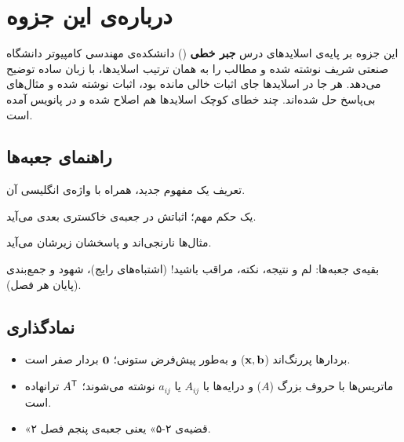 \chapter*{درباره‌ی این جزوه}

این جزوه بر پایه‌ی اسلایدهای درس \textbf{جبر خطی} () دانشکده‌ی مهندسی کامپیوتر دانشگاه صنعتی شریف نوشته شده و مطالب را به همان ترتیب اسلایدها، با زبان ساده توضیح می‌دهد. هر جا در اسلایدها جای اثبات خالی مانده بود، اثبات نوشته شده و مثال‌های بی‌پاسخ حل شده‌اند. چند خطای کوچک اسلایدها هم اصلاح شده و در پانویس آمده است.

\section*{راهنمای جعبه‌ها}
\begingroup
\renewcommand{\theboxnum}{۲-۵}
\begin{definition}
تعریف یک مفهوم جدید، همراه با واژه‌ی انگلیسی آن.
\end{definition}
\begin{theorem}
یک حکم مهم؛ اثباتش در جعبه‌ی خاکستری بعدی می‌آید.
\end{theorem}
\begin{example}
مثال‌ها نارنجی‌اند و پاسخشان زیرشان می‌آید.
\end{example}
\endgroup
بقیه‌ی جعبه‌ها: \textcolor{lemcolor}{\semifont لم و نتیجه}، \textcolor{notecolor}{\semifont نکته}، \textcolor{warncolor}{\semifont مراقب باشید!} (اشتباه‌های رایج)، \textcolor{intuitcolor}{\semifont شهود} و \textcolor{sumcolor}{\semifont جمع‌بندی} (پایان هر فصل).

\section*{نمادگذاری}
\begin{itemize}
  \item بردارها پررنگ‌اند ($\mathbf{x},\mathbf{b}$) و به‌طور پیش‌فرض ستونی؛ $\mathbf{0}$ بردار صفر است.
  \item ماتریس‌ها با حروف بزرگ ($A$) و درایه‌ها با $A_{ij}$ یا $a_{ij}$ نوشته می‌شوند؛ $A^{\mathsf{T}}$ ترانهاده است.
  \item «قضیه‌ی ۲-۵» یعنی جعبه‌ی پنجم فصل ۲.
\end{itemize}
